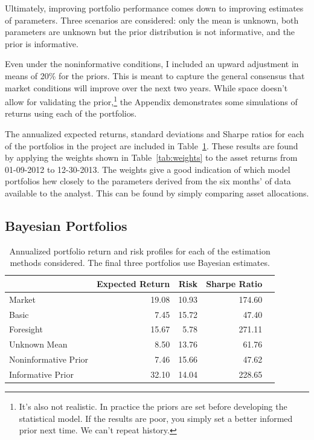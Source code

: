 \documentclass[a4paper]{article}\usepackage[]{graphicx}\usepackage[]{color}
\begin{document}
Ultimately, improving portfolio performance comes down to improving estimates of parameters. Three scenarios are considered: only the mean is unknown, both parameters are unknown but the prior distribution is not informative, and the prior is informative.

Even under the noninformative conditions, I included an upward adjustment in means of 20\% for the priors. This is meant to capture the general consensus that market conditions will improve over the next two years. While space doesn't allow for validating the prior,\footnote{It's also not realistic. In practice the priors are set before developing the statistical model. If the results are poor, you simply set a better informed prior next time. We can't repeat history.} the Appendix demonstrates some simulations of returns using each of the portfolios. 

The annualized expected returns, standard deviations and Sharpe ratios for each of the portfolios in the project are included in Table~\ref{tab:results}. These results are found by applying the weights shown in Table~\ref{tab:weights} to the asset returns from 01-09-2012 to 12-30-2013. The weights give a good indication of which model portfolios hew closely to the parameters derived from the six months' of data available to the analyst. This can be found by simply comparing asset allocations.

\subsection{Bayesian Portfolios}

\begin{table}
    \centering
\begin{tabular}{lrrrr}
  \hline
 & Expected Return & Risk & Sharpe Ratio \\ 
  \hline
Market & 19.08 & 10.93 & 174.60\\ 
  Basic & 7.45 & 15.72 & 47.40 \\ 
  Foresight & 15.67 & 5.78 & 271.11 \\ 
  Unknown Mean & 8.50 & 13.76 & 61.76 \\ 
  Noninformative Prior & 7.46 & 15.66 & 47.62 \\ 
  Informative Prior & 32.10 & 14.04 & 228.65 \\ 
   \hline
\end{tabular}
    \caption{Annualized portfolio return and risk profiles for each of the estimation methods considered. The final three portfolios use Bayesian estimates.}
    \label{tab:results}
\end{table}
\end{document}
